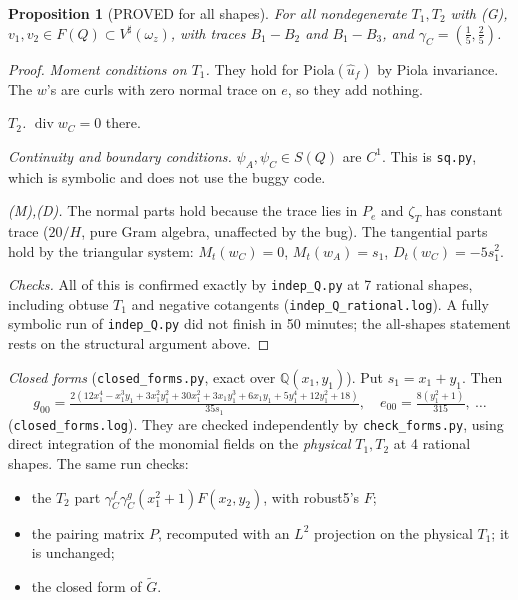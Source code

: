 \documentclass[11pt]{article}
\newtheorem{proposition}[theorem]{Proposition}
\theoremstyle{remark}
\begin{document}
\begin{proposition}[PROVED for all shapes]\label{prop:fix}
For all nondegenerate $T_1,T_2$ with (G), $v_1,v_2\in F(Q)\subset V^\sharp(\omega_z)$, with traces $B_1-B_2$ and $B_1-B_3$, and
$\gamma_C=(\tfrac15,\tfrac25)$.
\end{proposition}
\begin{proof}
\emph{Moment conditions on $T_1$.} They hold for $\mathrm{Piola}(\hat u_f)$ by Piola invariance. The $w$'s are curls with zero normal
trace on $e$, so they add nothing.

\emph{$T_2$.} $\operatorname{div}w_C=0$ there.

\emph{Continuity and boundary conditions.} $\psi_A,\psi_C\in S(Q)$ are $C^1$. This is \texttt{sq.py}, which is symbolic and does not use the buggy code.

\emph{(M),(D).} The normal parts hold because the trace lies in $P_e$ and $\zeta_T$ has constant trace ($20/H$, pure Gram algebra, unaffected
by the bug). The tangential parts hold by the triangular system: $M_t(w_C)=0$, $M_t(w_A)=s_1$, $D_t(w_C)=-5s_1^2$.

\emph{Checks.} All of this is confirmed exactly by \texttt{indep\_Q.py} at 7 rational shapes, including obtuse $T_1$
and negative cotangents (\texttt{indep\_Q\_rational.log}). A fully symbolic run of \texttt{indep\_Q.py} did not finish in 50 minutes; the
all-shapes statement rests on the structural argument above.
\end{proof}

\noindent\emph{Closed forms} (\texttt{closed\_forms.py}, exact over $\mathbb Q(x_1,y_1)$). Put $s_1=x_1+y_1$. Then
\[
g_{00}=\tfrac{2(12x_1^4-x_1^3y_1+3x_1^2y_1^2+30x_1^2+3x_1y_1^3+6x_1y_1+5y_1^4+12y_1^2+18)}{35s_1},\quad
e_{00}=\tfrac{8(y_1^2+1)}{315},\ \dots
\]
(\texttt{closed\_forms.log}). They are checked independently by \texttt{check\_forms.py}, using direct integration of the monomial fields on the
\emph{physical} $T_1,T_2$ at 4 rational shapes. The same run checks:
\begin{itemize}
\item the $T_2$ part $\gamma_C^f\gamma_C^g(x_1^2+1)F(x_2,y_2)$, with robust5's $F$;
\item the pairing matrix $P$, recomputed with an $L^2$ projection on the physical $T_1$; it is unchanged;
\item the closed form of $\tilde G$.
\end{itemize}
\end{document}
